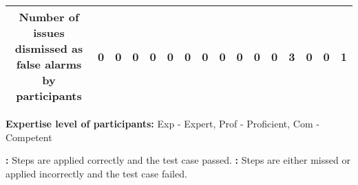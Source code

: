 \begin{table*}[]
\begin{adjustbox}{width=\textwidth,center}
\begin{tabular}{|cll|ccc|ccc|ccc|ccc|ccc|}
\multicolumn{3}{|c|}{\textbf{Number of issues dismissed as false alarms by participants}}                                                                                                                                                                                                                                                                                & \multicolumn{1}{c|}{\textbf{0}}                                                                           & \multicolumn{1}{c|}{\textbf{0}}                                                                            & \textbf{0}                                                   & \multicolumn{1}{c|}{\textbf{0}}                                                                           & \multicolumn{1}{c|}{\textbf{0}}                                                                            & \textbf{0}                                                   & \multicolumn{1}{c|}{\textbf{0}}                                                                            & \multicolumn{1}{c|}{\textbf{0}}                                                                            & \textbf{0}                                                   & \multicolumn{1}{c|}{\textbf{0}}                                                                            & \multicolumn{1}{c|}{\textbf{0}}                                                                           & \textbf{3}                                                   & \multicolumn{1}{c|}{\textbf{0}}                                                                            & \multicolumn{1}{c|}{\textbf{0}}                                                                           & \textbf{1}                                                   \\ \hline
\end{tabular}
\label{rq1userstudymodel}
\end{adjustbox}

\begin{tablenotes}
 \centering
        \fontsize{7.5pt}{7.5pt}\selectfont
        \item \textbf{Expertise level of participants:} Exp - Expert, Prof - Proficient, Com - Competent
        \item \textbf{\cmark:} Steps are applied correctly and the test case passed.        \textbf{\xmark:} Steps are either missed or applied incorrectly and the test case failed. 													
	\end{tablenotes}
 \vspace{-0.5cm}
\end{table*}